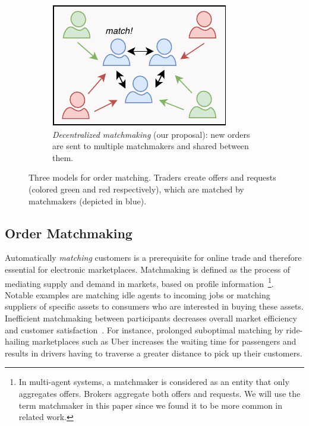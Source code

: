 \begin{figure}[t]
\begin{subfigure}[t]{.33\textwidth}
		\includegraphics[width=.9\linewidth]{introduction/assets/decentralized_matchmaking}
		\caption{\emph{Decentralized matchmaking} (our proposal): new orders are sent to multiple matchmakers and shared between them.}
		\label{fig:decentralized_matchmaking}
	\end{subfigure}
	\caption{Three models for order matching. Traders create offers and requests (colored green and red respectively), which are matched by matchmakers (depicted in blue).}
	\label{fig:matching_models}
\end{figure}

\subsection{Order Matchmaking}
\label{sec:matchmaking}
Automatically \emph{matching} customers is a prerequisite for online trade and therefore essential for electronic marketplaces.
Matchmaking is defined as the process of mediating supply and demand in markets, based on profile information~\cite{Veit:2003fs}\footnote{In multi-agent systems, a matchmaker is considered as an entity that only aggregates offers. Brokers aggregate both offers and requests. We will use the term matchmaker in this paper since we found it to be more common in related work.}.
Notable examples are matching idle agents to incoming jobs or matching suppliers of specific assets to consumers who are interested in buying these assets.
Inefficient matchmaking between participants decreases overall market efficiency and customer satisfaction~\cite{Wu2015TheM}.
For instance, prolonged suboptimal matching by ride-hailing marketplaces such as Uber increases the waiting time for passengers and results in drivers having to traverse a greater distance to pick up their customers.

